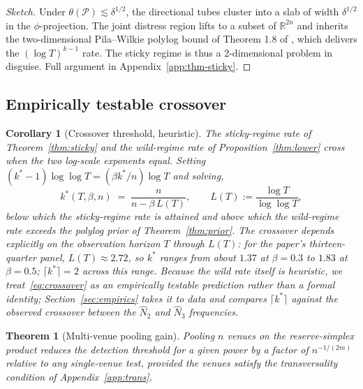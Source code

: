 \documentclass[12pt]{article}
\theoremstyle{sampledef}
\theoremstyle{sampleplain}
\newtheorem{theorem}[definition]{Theorem}
\newtheorem{corollary}[definition]{Corollary}
\theoremstyle{sampleremark}
\newcommand{\R}{\mathbb{R}}
\newcommand{\1}{\mathbf{1}}
\begin{document}
\begin{proof}[Sketch]
Under $\theta(\mathcal{P}) \lesssim \delta^{1/2}$, the directional
tubes cluster into a slab of width $\delta^{1/2}$ in the
$\phi$-projection. The joint distress region lifts to a subset of
$\R^{2n}$ and inherits the two-dimensional Pila--Wilkie polylog
bound of Theorem 1.8 of \citet{PilaWilkie2006}, which delivers the
$(\log T)^{k-1}$ rate. The sticky regime is thus a 2-dimensional
problem in disguise. Full argument in Appendix~\ref{app:thm-sticky}.
\end{proof}

\subsection{Empirically testable crossover}
\label{sec:thm-crossover}

\begin{corollary}[Crossover threshold, heuristic]\label{cor:crossover}
The sticky-regime rate of Theorem~\ref{thm:sticky} and the
wild-regime rate of Proposition~\ref{thm:lower} cross when the
two log-scale exponents equal. Setting
$(k^\ast-1)\log\log T = (\beta k^\ast / n)\log T$ and solving,
\begin{equation}\label{eq:crossover}
k^\ast(T,\beta,n) \;=\; \frac{n}{n - \beta\,L(T)},
\qquad L(T) := \frac{\log T}{\log\log T},
\end{equation}
below which the sticky-regime rate is attained and above which the
wild-regime rate exceeds the polylog prior of
Theorem~\ref{thm:prior}. The crossover depends explicitly on the
observation horizon $T$ through $L(T)$: for the paper's
thirteen-quarter panel, $L(T)\approx 2.72$, so $k^\ast$ ranges
from about $1.37$ at $\beta=0.3$ to $1.83$ at $\beta=0.5$;
$\lceil k^\ast\rceil = 2$ across this range. Because the wild
rate itself is heuristic, we treat~\eqref{eq:crossover} as an
empirically testable prediction rather than a formal identity;
Section~\ref{sec:empirics} takes it to data and compares
$\lceil k^\ast\rceil$ against the observed crossover between the
$\hat N_2$ and $\hat N_3$ frequencies.
\end{corollary}

\begin{theorem}[Multi-venue pooling gain]\label{thm:pooling}
Pooling $n$ venues on the reserve-simplex product reduces the
detection threshold for a given power by a factor of $n^{-1/(2m)}$
relative to any single-venue test, provided the venues satisfy the
transversality condition of Appendix~\ref{app:trans}.
\end{theorem}
\end{document}
